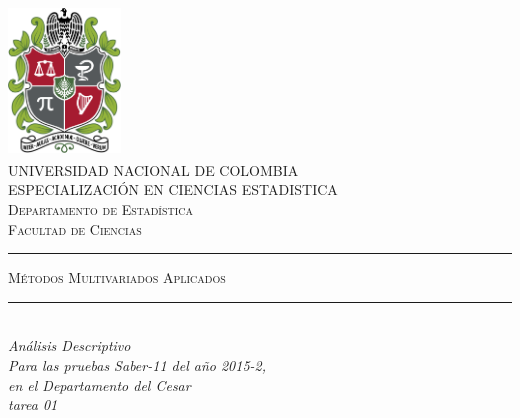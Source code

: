 \begin{titlepage}

\newcommand{\HRule}{\rule{\linewidth}{0.5mm}} %

\center %


\begin{minipage}{13.5cm}
\center

\includegraphics[width=3cm,height=4cm]{logo}\\[0.5cm] %


\textsc{\Large UNIVERSIDAD NACIONAL DE COLOMBIA \\[1.0cm]
{\large ESPECIALIZACIÓN EN CIENCIAS ESTADISTICA\\[0.5cm]
Departamento de Estadística\\[0.2cm]
Facultad de Ciencias}}\\[2cm]



\rule[1.7mm]{1cm}{0.5mm}
\hfill
\textsc{\Large Métodos Multivariados Aplicados}
\hfill
\rule[1.7mm]{1cm}{0.5mm}
\\[0.2cm]

{\Large
\textit{Análisis Descriptivo \\
Para las pruebas Saber-11 del año 2015-2, \\
en el Departamento del Cesar \\
tarea 01}
}\\[0.2cm]


\end{minipage}
\end{titlepage}
